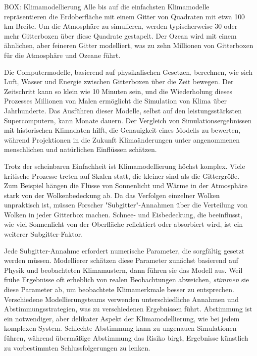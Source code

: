 \documentclass[12pt,paper=a4,DIV=12,parskip=never,chapterprefix=false,headings=standardclasses]{scrreprt}
\begin{document}
\begin{fullbox}{BOX: Klimamodellierung}
Alle bis auf die einfachsten Klimamodelle repräsentieren die Erdoberfläche mit einem Gitter von Quadraten mit etwa 100 km Breite. Um die Atmosphäre zu simulieren, werden typischerweise 30 oder mehr Gitterboxen über diese Quadrate gestapelt. Der Ozean wird mit einem ähnlichen, aber feineren Gitter modelliert, was zu zehn Millionen von Gitterboxen für die Atmosphäre und Ozeane führt.

Die Computermodelle, basierend auf physikalischen Gesetzen, berechnen, wie sich Luft, Wasser und Energie zwischen Gitterboxen über die Zeit bewegen. Der Zeitschritt kann so klein wie 10 Minuten sein, und die Wiederholung dieses Prozesses Millionen von Malen ermöglicht die Simulation von Klima über Jahrhunderte. Das Ausführen dieser Modelle, selbst auf den leistungsstärksten Supercomputern, kann Monate dauern. Der Vergleich von Simulationsergebnissen mit historischen Klimadaten hilft, die Genauigkeit eines Modells zu bewerten, während Projektionen in die Zukunft Klimaänderungen unter angenommenen menschlichen und natürlichen Einflüssen schätzen.

Trotz der scheinbaren Einfachheit ist Klimamodellierung höchst komplex. Viele kritische Prozesse treten auf Skalen statt, die kleiner sind als die Gittergröße. Zum Beispiel hängen die Flüsse von Sonnenlicht und Wärme in der Atmosphäre stark von der Wolkenbedeckung ab. Da das Verfolgen einzelner Wolken unpraktisch ist, müssen Forscher "Subgitter"-Annahmen über die Verteilung von Wolken in jeder Gitterbox machen. Schnee- und Eisbedeckung, die beeinflusst, wie viel Sonnenlicht von der Oberfläche reflektiert oder absorbiert wird, ist ein weiterer Subgitter-Faktor.

Jede Subgitter-Annahme erfordert numerische Parameter, die sorgfältig gesetzt werden müssen. Modellierer schätzen diese Parameter zunächst basierend auf Physik und beobachteten Klimamustern, dann führen sie das Modell aus. Weil frühe Ergebnisse oft erheblich von realen Beobachtungen abweichen, \emph{stimmen} sie diese Parameter ab, um beobachtete Klimamerkmale besser zu entsprechen. Verschiedene Modellierungsteams verwenden unterschiedliche Annahmen und Abstimmungsstrategien, was zu verschiedenen Ergebnissen führt. Abstimmung ist ein notwendiger, aber delikater Aspekt der Klimamodellierung, wie bei jedem komplexen System. Schlechte Abstimmung kann zu ungenauen Simulationen führen, während übermäßige Abstimmung das Risiko birgt, Ergebnisse künstlich zu vorbestimmten Schlussfolgerungen zu lenken.


\end{fullbox}
\end{document}
